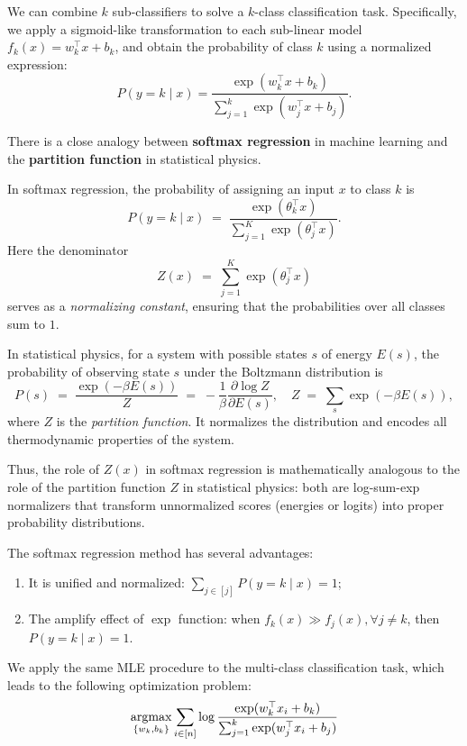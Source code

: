 \documentclass[../main]{subfiles}
\begin{document}
We can combine $k$ sub-classifiers to solve a $k$-class classification task. 
Specifically, we apply a sigmoid-like transformation to each sub-linear model 
$f_k(x) = w_k^\top x + b_k$, and obtain the probability of class $k$ using a normalized expression:
\begin{equation}
    P(y = k \mid x) 
    = \frac{\exp(w_k^\top x + b_k)}{\sum_{j=1}^{k} \exp(w_j^\top x + b_j)}.
\end{equation}
\begin{note}
  There is a close analogy between \textbf{softmax regression} in machine learning and the \textbf{partition function} in statistical physics.

  In softmax regression, the probability of assigning an input $x$ to class $k$ is
  \begin{equation}
    P(y=k \mid x) \;=\; \frac{\exp(\theta_k^\top x)}{\sum_{j=1}^K \exp(\theta_j^\top x)} .
  \end{equation}
  Here the denominator
  \begin{equation}
    Z(x) \;=\; \sum_{j=1}^K \exp(\theta_j^\top x)
  \end{equation}
  serves as a \emph{normalizing constant}, ensuring that the probabilities over all classes sum to $1$.

  In statistical physics, for a system with possible states $s$ of energy $E(s)$, the probability of observing state $s$ under the Boltzmann distribution is
  \begin{equation}
    P(s) \;=\; \frac{\exp(-\beta E(s))}{Z}\;=\;-\frac{1}{\beta}\frac{\partial \log Z}{\partial E(s)}, 
    \quad Z \;=\; \sum_{s} \exp(-\beta E(s)) ,
  \end{equation}
  where $Z$ is the \emph{partition function}. It normalizes the distribution and encodes all thermodynamic properties of the system.

  Thus, the role of $Z(x)$ in softmax regression is mathematically analogous to the role of the partition function $Z$ in statistical physics: both are log-sum-exp normalizers that transform unnormalized scores (energies or logits) into proper probability distributions.
\end{note}
\vspace{1em}
The softmax regression method has several advantages:
\begin{enumerate}
  \item It is unified and normalized: $\sum_{j\in[j]}P(y=k\mid x)=1$;
  \item The amplify effect of $\exp$ function: when $f_k(x)\gg f_j(x),\forall j\neq k$, then $P(y=k\mid x)=1$.
\end{enumerate}
We apply the same MLE procedure to the multi-class classification task, 
which leads to the following optimization problem:
\begin{equation}
    \mathop{\mathrm{argmax}}_{\{w_k,b_k\}} \sum_{i\in[n]} 
    \log \frac{\exp(w_k^\top x_i + b_k)}{\sum_{j=1}^{k} \exp(w_j^\top x_i + b_j)}
\end{equation}
\end{document}
